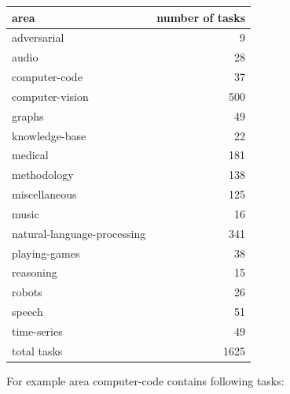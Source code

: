 \documentclass[11pt]{report}
\begin{document}
\begin{center}
\begin{tabular}{|l|r|}
\hline
area & number of tasks\\
\hline
adversarial & 9\\
audio & 28\\
computer-code & 37\\
computer-vision & 500\\
graphs & 49\\
knowledge-base & 22\\
medical & 181\\
methodology & 138\\
miscellaneous & 125\\
music & 16\\
natural-language-processing & 341\\
playing-games & 38\\
reasoning & 15\\
robots & 26\\
speech & 51\\
time-series & 49\\
\hline
total tasks & 1625\\
\hline
\end{tabular}
\end{center}

For example area computer-code contains following tasks:
\end{document}
